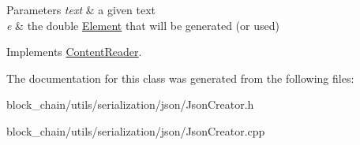 \begin{DoxyParams}{Parameters}
{\em text} & a given text \\
\hline
{\em e} & the double \mbox{\hyperlink{classElement}{Element}} that will be generated (or used) \\
\hline
\end{DoxyParams}


Implements \mbox{\hyperlink{classContentReader_ab4ba739ee5241848ae8af86e64e43a40}{Content\+Reader}}.



The documentation for this class was generated from the following files\+:\begin{DoxyCompactItemize}
\item 
block\+\_\+chain/utils/serialization/json/Json\+Creator.\+h\item 
block\+\_\+chain/utils/serialization/json/Json\+Creator.\+cpp\end{DoxyCompactItemize}
